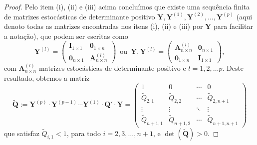 \documentclass[twoside,openright,titlepage,numbers=noenddot,headinclude,  lineheaders footinclude=true,cleardoublepage=empty,
                                BCOR=5mm,paper=a4,fontsize=12pt ]{scrbook}
\theoremstyle{definition}
\begin{document}
\begin{proof}
Pelo item (i), (ii) e (iii) acima
concluímos que existe uma sequência finita
de matrizes estocásticas de determinante positivo
$\mathbf{Y}, \mathbf{Y}^{(1)}, \mathbf{Y}^{(2)},
\ldots, 
\mathbf{Y}^{(p)}$ (aqui denoto todas as matrizes
encontradas nos itens (i), (ii) e (iii) por $\mathbf{Y}$
 para facilitar
a notação), que podem ser escritas como
\[
 \mathbf{Y}^{(l)} = 
\begin{pmatrix}
 \mathbf{I}_{1 \times 1} &  \mathbf{0}_{1 \times n}\\
\mathbf{0}_{n \times 1} & \mathbf{A}^{(l)}_{n \times n}
\end{pmatrix}
\, \text{ ou } \,
\mathbf{Y}, \mathbf{Y}^{(l)} = 
\begin{pmatrix}
\mathbf{A}^{(l)}_{n \times n} & \mathbf{0}_{n \times 1} \\
 \mathbf{0}_{1 \times n} & \mathbf{I}_{1 \times 1}
\end{pmatrix}
,
\]
com $\mathbf{A}^{(l)}_{n \times n}$ matrizes estocásticas 
de determinante positivo e $l = 1, 2, \ldots p$. Deste resultado,
obtemos a matriz
\[
\mathbf{\widetilde{Q}} := 
\mathbf{Y}^{(p)} \cdot \mathbf{Y}^{(p-1)}
\cdots \mathbf{Y}^{(1)} \cdot \mathbf{Q'} \cdot \mathbf{Y}=
\begin{pmatrix}
1 & 0  &  \cdots & 0 \\
\widetilde{Q}_{2,1} & \widetilde{Q}_{2,2}  & \cdots &
\widetilde{Q}_{2,n+1}\\
\vdots & \vdots & \ddots & \vdots \\
\widetilde{Q}_{n+1,1} & \widetilde{Q}_{n+1,2} &  
\cdots & 
\widetilde{Q}_{n+1,n+1}
\end{pmatrix}
\]
que satisfaz $\widetilde{Q}_{i,1} < 1$, para todo
$i = 2, 3, \ldots, n+1$, e $\det(\mathbf{\widetilde{Q}}) >0$.


\end{proof}
\end{document}
